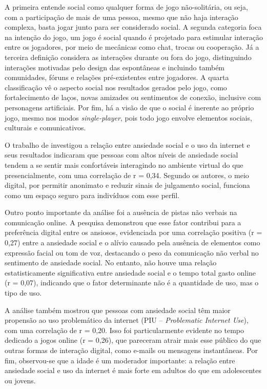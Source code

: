 A primeira entende social como qualquer forma de jogo não-solitária, ou seja, com a participação de mais de uma pessoa, mesmo que não haja interação complexa, basta jogar junto para ser considerado social. A segunda categoria foca na intenção do jogo, um jogo é social quando é projetado para estimular interação entre os jogadores, por meio de mecânicas como chat, trocas ou cooperação. Já a terceira definição considera as interações durante ou fora do jogo, distinguindo interações motivadas pelo design das espontâneas e incluindo também comunidades, fóruns e relações pré-existentes entre jogadores. A quarta classificação vê o aspecto social nos resultados gerados pelo jogo, como fortalecimento de laços, novas amizades ou sentimentos de conexão, inclusive com personagens artificiais. Por fim, há a visão de que o social é inerente ao próprio jogo, mesmo nos modos \textit{single-player}, pois todo jogo envolve elementos sociais, culturais e comunicativos.

O trabalho de  investigou a relação entre ansiedade social e o uso da internet e seus resultados indicaram que pessoas com altos níveis de ansiedade social tendem a se sentir mais confortáveis interagindo no ambiente virtual do que presencialmente, com uma correlação de r = 0{,}34. Segundo os autores, o meio digital, por permitir anonimato e reduzir sinais de julgamento social, funciona como um espaço seguro para indivíduos com esse perfil.

Outro ponto importante da análise foi a ausência de pistas não verbais na comunicação online. A pesquisa demonstrou que esse fator contribui para a preferência digital entre os ansiosos, evidenciada por uma correlação positiva (r = 0{,}27) entre a ansiedade social e o alívio causado pela ausência de elementos como expressão facial ou tom de voz, destacando o peso da comunicação não verbal no sentimento de ansiedade social. No entanto, não houve uma relação estatisticamente significativa entre ansiedade social e o tempo total gasto online (r = 0{,}07), indicando que o fator determinante não é a quantidade de uso, mas o tipo de uso.

A análise também mostrou que pessoas com ansiedade social têm maior propensão ao uso problemático da internet (PIU -- \textit{Problematic Internet Use}), com uma correlação de r = 0{,}20. Isso foi particularmente evidente no tempo dedicado a jogos online (r = 0{,}26), que pareceram atrair mais esse público do que outras formas de interação digital, como e-mails ou mensagens instantâneas. Por fim, observou-se que a idade é um moderador importante: a relação entre ansiedade social e uso da internet é mais forte em adultos do que em adolescentes ou jovens.

